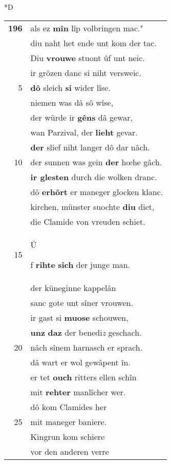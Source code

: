 \documentclass[8pt,a4paper,notitlepage]{article}
\begin{document}
\begin{table}[ht]
\begin{minipage}[t]{0.5\linewidth}
\small
\begin{center}*D
\end{center}
\begin{tabular}{rl}
\textbf{196} & als ez \textbf{mîn} lîp volbringen mac."\\ 
 & diu naht het ende unt kom der tac.\\ 
 & Diu \textbf{vrouwe} stuont ûf unt neic.\\ 
 & ir grôzen danc si niht versweic.\\ 
5 & \textbf{dô} sleich \textbf{si} wider lîse.\\ 
 & niemen was dâ sô wîse,\\ 
 & der würde ir \textbf{gêns} dâ gewar,\\ 
 & wan Parzival, der \textbf{lieht} gevar.\\ 
 & \textbf{der} slief niht langer dô dar nâch.\\ 
10 & der sunnen was gein \textbf{der} hœhe gâch.\\ 
 & \textbf{ir glesten} durch die wolken dranc.\\ 
 & dô \textbf{erhôrt} er maneger glocken klanc.\\ 
 & kirchen, münster suochte \textbf{diu} diet,\\ 
 & die Clamide von vreuden schiet.\\ 
15 & \begin{large}Û\end{large}f \textbf{rihte} \textbf{sich} der junge man.\\ 
 & der küneginne kappelân\\ 
 & sanc gote unt sîner vrouwen.\\ 
 & ir gast si \textbf{muose} schouwen,\\ 
 & \textbf{unz} \textbf{daz} der benedi\textit{z} geschach.\\ 
20 & nâch sînem harnasch er sprach.\\ 
 & dâ wart er wol gewâpent în.\\ 
 & er tet \textbf{ouch} ritters ellen schîn\\ 
 & mit \textbf{rehter} manlîcher wer.\\ 
 & dô kom Clamides her\\ 
25 & mit maneger baniere.\\ 
 & Kingrun kom schiere\\ 
 & vor den anderen verre\\ 

\end{tabular}
\end{minipage}
\end{table}
\end{document}
